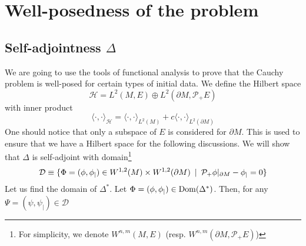 \section{Well-posedness of the problem}\label{wen-sect-saw}
\subsection{Self-adjointness $\Delta$}
We are going to use the tools of functional analysis to prove that the Cauchy problem is well-posed for certain types of initial data.
We define the Hilbert space 
\begin{equation*}
\mathcal{H} = L^{2}(M,E)\oplus L^{2}(\partial M, \mathcal{P}_+ E)
\end{equation*}
with inner product
\begin{equation}\label{wen-innerpdt}
\langle \cdot, \cdot \rangle _\mathcal{H} = \langle \cdot, \cdot \rangle _{L^2(M)} + c \langle \cdot, \cdot \rangle _{L^2(\partial M)}
\end{equation}
One should notice that only a subspace of $E$ is considered for $\partial M$.
This is used to ensure that we have a Hilbert space for the following discussions.
We will show that $\Delta$ is self-adjoint with domain\footnote{
For simplicity,
we denote $W^{n,m}(M,E)$ (resp. $W^{n,m}(\partial M, \mathcal{P}_+E)$)}
\begin{equation*}
\mathcal{D} \equiv \{ \Phi = (\phi, \phi_|) \in W^{1,2}(M)\times W^{1,2}(
\partial M)\enskip | \enskip \mathcal{P}_+\phi \vert_{\partial M} - \phi_| = 0 \}
\end{equation*}
Let us find the domain of $\Delta^*$.  
Let $\Phi = (\phi, \phi_|) \in \mathrm{Dom}(\Delta^*)$.
Then, for any $ \Psi = (\psi, \psi_|)\in\mathcal{D}$
